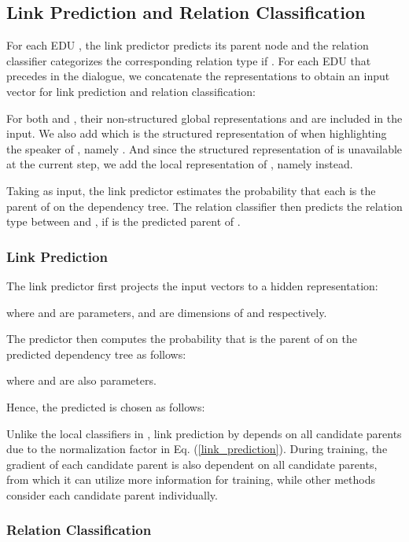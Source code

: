 \documentclass[letterpaper]{article} \usepackage{aaai19}  \usepackage{times}  \usepackage{helvet}  \usepackage{courier}  \usepackage{url}  \usepackage{graphicx}  \usepackage{amssymb}
\begin{document}
\subsection{Link Prediction and Relation Classification}

For each EDU , the link predictor predicts its parent node  and the relation classifier categorizes the corresponding relation type  if . 
For each EDU  that precedes  in the dialogue, we concatenate the representations  to obtain an input vector  for link prediction and relation classification:

For both  and , their non-structured global representations  and  are included in the input. 
We also add  which is the structured representation of  when highlighting the speaker of , namely .
And since the structured representation of  is unavailable at the current step, we add the local representation of , namely  instead.

Taking  as input, the link predictor estimates the probability that each  is the parent of  on the dependency tree. The relation classifier then predicts the relation type between  and , if  is the predicted parent of .

\subsubsection{Link Prediction}

The link predictor first projects the input vectors  to a hidden representation:

where  and  are parameters,  and  are dimensions of  and  respectively.

The predictor then computes the probability that  is the parent of  on the predicted dependency tree as follows:


where  and  are also parameters.

Hence, the predicted  is chosen as follows:


Unlike the local classifiers in \cite{li2014text,afantenos2015discourse,perret2016integer}, link prediction by  depends on all candidate parents due to the  normalization factor in Eq. (\ref{link_prediction}). 
During training, the gradient of each candidate parent is also dependent on all candidate parents, from which it can utilize more information for training, while other methods consider each candidate parent individually.

\subsubsection{Relation Classification}
\end{document}

